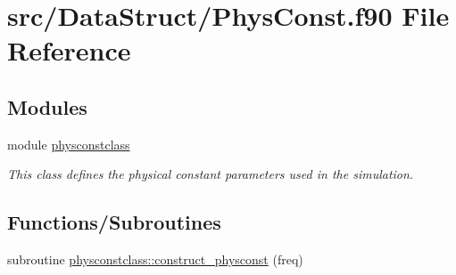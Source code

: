 \hypertarget{_phys_const_8f90}{}\section{src/\+Data\+Struct/\+Phys\+Const.f90 File Reference}
\label{_phys_const_8f90}
\subsection*{Modules}
\begin{DoxyCompactItemize}
\item 
module \mbox{\hyperlink{namespacephysconstclass}{physconstclass}}
\begin{DoxyCompactList}\small\item\em This class defines the physical constant parameters used in the simulation. \end{DoxyCompactList}\end{DoxyCompactItemize}
\subsection*{Functions/\+Subroutines}
\begin{DoxyCompactItemize}
\item 
subroutine \mbox{\hyperlink{namespacephysconstclass_ad68ae2acfa376befa6478a8b40a80168}{physconstclass\+::construct\+\_\+physconst}} (freq)
\end{DoxyCompactItemize}
